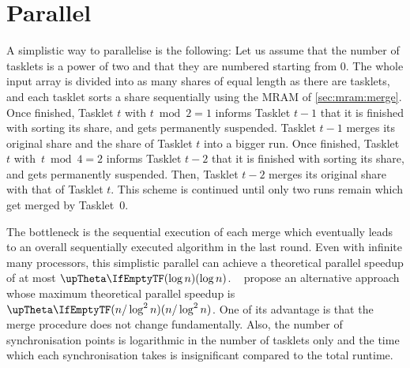 \section{Parallel \texorpdfstring{\MS{}}{MergeSort}}
\label{sec:par}

A simplistic way to parallelise \MS{} is the following:
Let us assume that the number of tasklets is a power of two and that they are numbered starting from 0.
The whole input array is divided into as many shares of equal length as there are tasklets, and each tasklet sorts a share sequentially using the \ac{MRAM} \MS{} of \cref{sec:mram:merge}.
Once finished, Tasklet \(t\) with \(t \bmod 2 = 1\) informs Tasklet \(t - 1\) that it is finished with sorting its share, and gets permanently suspended.
Tasklet \(t - 1\) merges its original share and the share of Tasklet \(t\) into a bigger run.
Once finished, Tasklet \(t\) with~\(t \bmod 4 = 2\) informs Tasklet \(t - 2\) that it is finished with sorting its share, and gets permanently suspended.
Then, Tasklet \(t - 2\) merges its original share with that of Tasklet \(t\).
This scheme is continued until only two runs remain which get merged by Tasklet~0.

The bottleneck is the sequential execution of each merge which eventually leads to an overall sequentially executed algorithm in the last round.
Even with infinite many processors, this simplistic parallel \MS{} can achieve a theoretical parallel speedup of at most \(\bigtheta{\log n}\).
~\cite{cormen2013algorithmen} propose an alternative approach whose maximum theoretical parallel speedup is \(\bigtheta{n / \log^2 n}\).
One of its advantage is that the merge procedure does not change fundamentally.
Also, the number of synchronisation points is logarithmic in the number of tasklets only and the time which each synchronisation takes is insignificant compared to the total runtime.




